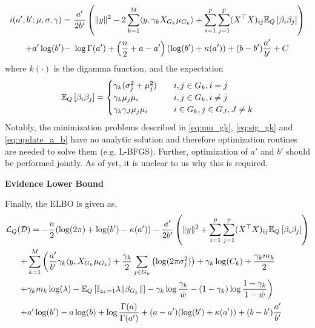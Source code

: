 \begin{equation} \label{eq:update_a_b} 
\begin{aligned}
    i(a', b'; \mu, \sigma, \gamma) = & \
	\frac{a'}{2 b'} 
	\left( 
	    \| y \|^2 - 
	    2 
	    \sum_{k = 1}^M \langle y, \gamma_k X_{G_k} \mu_{G_k} \rangle +  
	    \sum_{i=1}^p \sum_{j=1}^p (X^\top X)_{ij} 
	    \mathbb{E}_Q \left[ \beta_i \beta_j \right]
	\right) \\
	+ 
	a' \log (b')  
	- &\
	\log \Gamma(a') + 
	\left( \frac{n}{2} + a-a' \right)(\log(b') + \kappa(a')) + 
	(b - b')\frac{a'}{b'} + C
\end{aligned}
\end{equation}
where $k(\cdot)$ is the digamma function, and the expectation
\begin{equation}
    \mathbb{E}_{Q} \left[ \beta_i \beta_j \right] = \begin{cases}
	\gamma_k (\sigma_{j}^2 + \mu_{j}^2) 	& \quad i,j \in G_k, i=j \\
	\gamma_k \mu_{j}\mu_{i} 		& \quad i,j \in G_k, i \neq j \\
	\gamma_k \gamma_J \mu_{j}\mu_{i} 	& \quad i \in G_k, j \in G_J, J \neq k
    \end{cases}
\end{equation}
Notably, the minimization problems described in \eqref{eq:mu_gk}, \eqref{eq:sig_gk} and \eqref{eq:update_a_b} have no analytic solution and therefore optimization routines are needed to solve them (e.g. L-BFGS). Further, optimization of $a'$ and $b'$ should be performed jointly. As of yet, it is unclear to us why this is required.


\textbf{Evidence Lower Bound}

Finally, the ELBO is given as,
\begin{equation*} \label{eq:elbo} 
\begin{aligned}
    \mathcal{L}_Q(\mathcal{D} &) = 
- 
    \frac{n}{2} (\log(2 \pi) + \log(b') - \kappa(a'))
- 
    \frac{a'}{2b'} \left( \| y \|^2  + \sum_{i=1}^p \sum_{j=1}^p (X^\top X)_{ij} \mathbb{E}_Q \left[ \beta_i \beta_j \right] \right)\\
+& 
    \sum_{k=1}^M \bigg(  
    \frac{a'}{b'} \gamma_k \langle y, X_{G_k} \mu_{G_k} \rangle
+
    \frac{\gamma_k}{2} \sum_{j \in G_k} \left( \log( 2 \pi \sigma_j^2) \right)
+
    \gamma_k \log(C_k)
+ 
    \frac{\gamma_k m_k}{2} \\
+ &
    \gamma_k m_k \log (\lambda)
-
    \mathbb{E}_Q \left[ \mathbb{I}_{z_k =1} \lambda \| \beta_{G_k} \| \right]
-
    \gamma_k \log \frac{\gamma_k}{\bar{w}}
-
    (1-\gamma_k) \log \frac{1 - \gamma_k}{1 - \bar{w}} 
    \bigg) \\
+&
    a' \log (b') - a \log(b) + \log \frac{\Gamma(a)}{\Gamma(a')} + (a-a')(\log(b') + \kappa(a')) + (b - b')\frac{a'}{b'}
\end{aligned}
\end{equation*}

